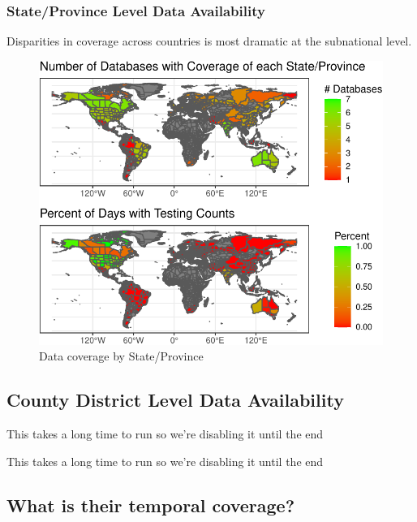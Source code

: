 \documentclass[
]{book}
\begin{document}
\hypertarget{stateprovince-level-data-availability}{%
\subsubsection{State/Province Level Data Availability}\label{stateprovince-level-data-availability}}

Disparities in coverage across countries is most dramatic at the subnational level.

\begin{figure}

{\centering \includegraphics{HowToBeCarefulWithCovid19Counts_files/figure-latex/nice-fig3-1} 

}

\caption{Data coverage by State/Province}\label{fig:nice-fig3}
\end{figure}

\hypertarget{county-district-level-data-availability}{%
\subsection{County District Level Data Availability}\label{county-district-level-data-availability}}

This takes a long time to run so we're disabling it until the end

This takes a long time to run so we're disabling it until the end

\hypertarget{what-is-their-temporal-coverage}{%
\subsection{What is their temporal coverage?}\label{what-is-their-temporal-coverage}}
\end{document}
